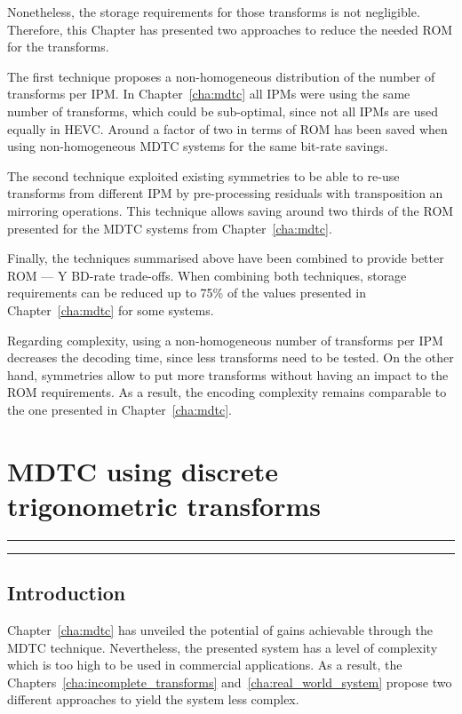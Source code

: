 \documentclass[11pt,a4paper,openright,twoside]{book}
\providecommand{\chaptertoc}{
	\startcontents[chapters]
	\hrule
	\vspace{1em}
	\printcontents[chapters]{}{1}{{\sf\large\bfseries Contents}}
	\vspace{1em}
	\hrule
}
\numberwithin{equation}{section} %
\numberwithin{figure}{section} %
\numberwithin{table}{section} %
\begin{document}
Nonetheless, the storage requirements for those transforms is not negligible.
Therefore, this Chapter has presented two approaches to reduce the needed
\acs{ROM} for the transforms.

The first technique proposes a non-homogeneous distribution of the number of
transforms per \ac{IPM}.
In Chapter~\ref{cha:mdtc} all \acp{IPM} were using the same number of
transforms, which could be sub-optimal, since not all \acp{IPM} are used
equally in \ac{HEVC}.
Around a factor of two in terms of \acs{ROM} has been saved when using
non-homogeneous \ac{MDTC} systems for the same bit-rate savings.

The second technique exploited existing symmetries to be able to re-use
transforms from different \ac{IPM} by pre-processing residuals with
transposition an mirroring operations.
This technique allows saving around two thirds of the \acs{ROM} presented for
the \ac{MDTC} systems from Chapter~\ref{cha:mdtc}.

Finally, the techniques summarised above have been combined to provide better
\acs{ROM} --- Y \ac{BD}-rate trade-offs.
When combining both techniques, storage requirements can be reduced up to 75\%
of the values presented in Chapter~\ref{cha:mdtc} for some systems.

Regarding complexity, using a non-homogeneous number of transforms per
\ac{IPM} decreases the decoding time, since less transforms need to be tested.
On the other hand, symmetries allow to put more transforms without having an
impact to the \acs{ROM} requirements.
As a result, the encoding complexity remains comparable to the one presented
in Chapter~\ref{cha:mdtc}.

\chapter{\acs{MDTC} using discrete trigonometric transforms}
\label{cha:dtt}
\chaptertoc

\section{Introduction}
\label{sec:introduction}

Chapter~\ref{cha:mdtc} has unveiled the potential of gains achievable through
the \ac{MDTC} technique.
Nevertheless, the presented system has a level of complexity which is too
high to be used in commercial applications.
As a result, the Chapters~\ref{cha:incomplete_transforms}
and~\ref{cha:real_world_system} propose two different approaches to yield the
system less complex.
\end{document}
